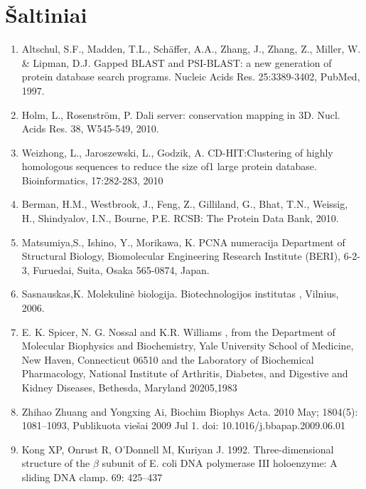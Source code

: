 \documentclass[a4paper,12pt]{article}
\begin{document}
\section{Šaltiniai}
\begin{enumerate}
	\item Altschul, S.F., Madden, T.L., Schäffer, A.A., Zhang, J., Zhang, Z., Miller, W. \& Lipman, D.J. Gapped BLAST and PSI-BLAST: a new generation of protein database search programs. Nucleic Acids Res. 25:3389-3402, PubMed, 1997.
	
	\item Holm, L., Rosenström, P. Dali server: conservation mapping in 3D. Nucl. Acids Res. 38, W545-549, 2010. 
	
	\item Weizhong, L., Jaroszewski, L., Godzik, A. CD-HIT:Clustering of highly homologous sequences to reduce the size of1 large protein database. Bioinformatics,  17:282-283, 2010
	\item Berman, H.M., Westbrook, J., Feng, Z., Gilliland, G., Bhat, T.N., Weissig, H., Shindyalov, I.N., Bourne, P.E. RCSB: The Protein Data Bank, 2010. 
	
	\item Matsumiya,S., Ishino, Y., Morikawa, K. PCNA numeracija Department of Structural Biology, Biomolecular Engineering Research Institute (BERI), 6-2-3, Furuedai, Suita, Osaka 565-0874, Japan.
	
	\item Sasnauskas,K. Molekulinė biologija. Biotechnologijos institutas , Vilnius, 2006.
	
	\item  E. K. Spicer, N. G. Nossal and K.R. Williams , from the Department of Molecular Biophysics and Biochemistry, Yale University School of Medicine, New Haven, Connecticut 06510 and the Laboratory of Biochemical Pharmacology, National Institute of Arthritis, Diabetes, and Digestive and Kidney Diseases, Bethesda, Maryland 20205,1983
	
	\item \hypertarget{Zhihao}{Zhihao Zhuang and Yongxing Ai, Biochim Biophys Acta. 2010 May; 1804(5): 1081–1093, Publikuota viešai 2009 Jul 1. doi: 10.1016/j.bbapap.2009.06.01}
	
	\item \hypertarget{Kong}{Kong XP, Onrust R, O’Donnell M, Kuriyan J. 1992. Three-dimensional structure of the $\beta$ subunit of E. coli DNA polymerase III holoenzyme: A sliding DNA clamp. 69: 425–437}
	

\end{enumerate}
\end{document}
